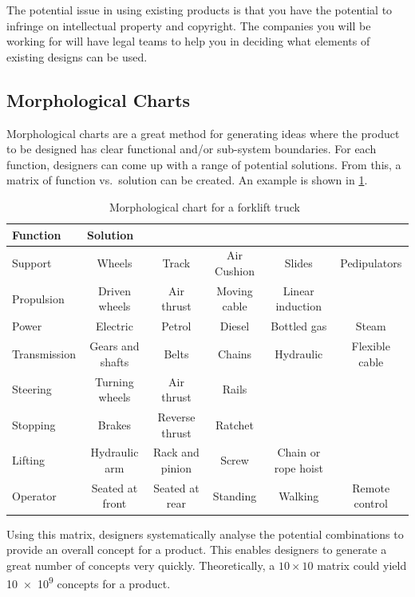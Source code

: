 The potential issue in using existing products is that you have the potential to infringe on intellectual property and copyright. The companies you will be working for will have legal teams to help you in deciding what elements of existing designs can be used.

\subsection{Morphological Charts}

Morphological charts are a great method for generating ideas where the product to be designed has clear functional and/or sub-system boundaries. For each function, designers can come up with a range of potential solutions. From this, a matrix of function vs.\ solution can be created. An example is shown in \cref{fig-morphological-chart}.


\begin{table}[h!]
  \centering
  \caption[Morphological chart for a forklift truck]{Morphological chart for a forklift truck~\citep{cross1989}}
  \label{fig-morphological-chart}
  \small
  \begin{tabular}{l | c c c c c}
  \toprule
  Function & \multicolumn{5}{l}{Solution} \\
  \midrule
  Support & Wheels & Track & Air Cushion & Slides & Pedipulators \\
  Propulsion & Driven wheels & Air thrust & Moving cable & Linear induction \\
  Power & Electric & Petrol & Diesel & Bottled gas & Steam \\
  Transmission & Gears and shafts & Belts & Chains & Hydraulic & Flexible cable \\
  Steering & Turning wheels & Air thrust & Rails & & \\
  Stopping & Brakes & Reverse thrust & Ratchet & & \\
  Lifting & Hydraulic arm & Rack and pinion & Screw & Chain or rope hoist & \\
  Operator & Seated at front & Seated at rear & Standing & Walking & Remote control \\
  \bottomrule
  \end{tabular}
  \vspace{1em}
\end{table}


Using this matrix, designers systematically analyse the potential combinations to provide an overall concept for a product. This enables designers to generate a great number of concepts very quickly. Theoretically, a \(10\times10\) matrix could yield \num{10e9} concepts for a product.


